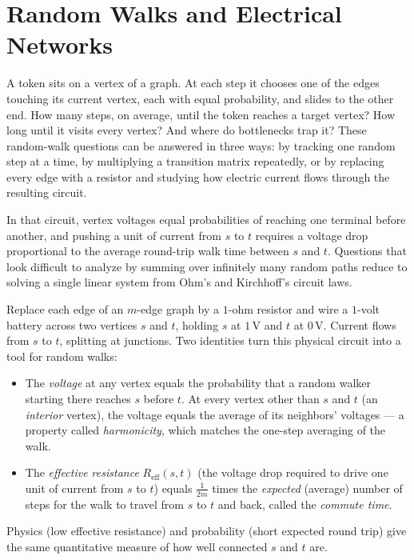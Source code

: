\chapter{Random Walks and Electrical Networks}

A token sits on a vertex of a graph. At each step it chooses one of the edges touching its current vertex, each with equal probability, and slides to the other end. How many steps, on average, until the token reaches a target vertex? How long until it visits every vertex? And where do bottlenecks trap it? These random-walk questions can be answered in three ways: by tracking one random step at a time, by multiplying a transition matrix repeatedly, or by replacing every edge with a resistor and studying how electric current flows through the resulting circuit.

In that circuit, vertex voltages equal probabilities of reaching one terminal before another, and pushing a unit of current from $s$ to $t$ requires a voltage drop proportional to the average round-trip walk time between $s$ and $t$. Questions that look difficult to analyze by summing over infinitely many random paths reduce to solving a single linear system from Ohm's and Kirchhoff's circuit laws.

\begin{intuitionbox}
Replace each edge of an $m$-edge graph by a $1$-ohm resistor and wire a $1$-volt battery across two vertices $s$ and $t$, holding $s$ at $1\,\text{V}$ and $t$ at $0\,\text{V}$. Current flows from $s$ to $t$, splitting at junctions. Two identities turn this physical circuit into a tool for random walks:
\begin{itemize}
  \item The \emph{voltage} at any vertex equals the probability that a random walker starting there reaches $s$ before $t$. At every vertex other than $s$ and $t$ (an \emph{interior} vertex), the voltage equals the average of its neighbors' voltages --- a property called \emph{harmonicity}, which matches the one-step averaging of the walk.
  \item The \emph{effective resistance} $R_{\mathrm{eff}}(s,t)$ (the voltage drop required to drive one unit of current from $s$ to $t$) equals $\frac{1}{2m}$ times the \emph{expected} (average) number of steps for the walk to travel from $s$ to $t$ and back, called the \emph{commute time}.
\end{itemize}
Physics (low effective resistance) and probability (short expected round trip) give the same quantitative measure of how well connected $s$ and $t$ are.
\end{intuitionbox}

